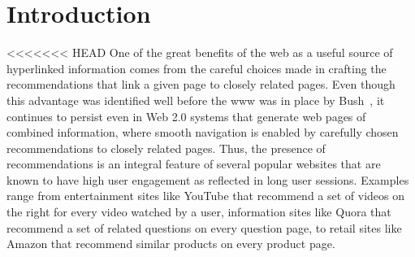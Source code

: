 \begin{abstract}
\iffalse
In this paper, we study the problem of graph recommendations as
variants of bipartite matching problems. We consider the problem
of solving such matching problems in practice at web-scale. To achieve
this we introduce several models to simulate underlying input graph
structures. We then analyze the conditions under which a random sample
of edges using constant memory already suffices to be a
'good' recommendation algorithm as opposed the cases when we may consider
the more classical and involved linear memory polynomial time algorithms.
We also show how to select the number of recommendations per item while
building a website so that there exists a 'perfect' graph recommendation.
\fi

\end{abstract}

\section{Introduction}

<<<<<<< HEAD
One of the great benefits of the web as a useful source of hyperlinked
information comes from the careful choices made in crafting the recommendations
that link a given page to closely related pages. Even though this advantage was
identified well before the www was in place by Bush~\cite{Bush45}, it continues
to persist even in Web 2.0 systems that generate web pages of combined
information, where smooth navigation is enabled by carefully chosen
recommendations to closely related pages. Thus, the presence of recommendations
is an integral feature of several popular websites that are known to have high
user engagement as reflected in long user sessions. Examples range from 
entertainment sites like YouTube that recommend a set of videos on the right
for every video watched by a user, information sites like Quora that recommend
a set of related questions on every question page, to retail sites like Amazon
that recommend similar products on every product page. \vs

